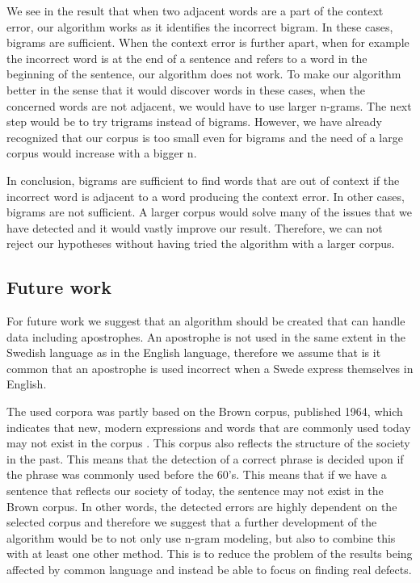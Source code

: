 \documentclass[a4paper,12pt]{article}
\begin{document}
We see in the result that when two adjacent words are a part of the context error, our algorithm works as it identifies the incorrect bigram. In these cases, bigrams are sufficient. When the context error is further apart, when for example the incorrect word is at the end of a sentence and refers to a word in the beginning of the sentence, our algorithm does not work. To make our algorithm better in the sense that it would discover words in these cases, when the concerned words are not adjacent, we would have to use larger n-grams. The next step would be to try trigrams instead of bigrams. However, we have already recognized that our corpus is too small even for bigrams and the need of a large corpus would increase with a bigger n.

In conclusion, bigrams are sufficient to find words that are out of context if the incorrect word is adjacent to a word producing the context error. In other cases, bigrams are not sufficient. A larger corpus would solve many of the issues that we have detected and it would vastly improve our result. Therefore, we can not reject our hypotheses without having tried the algorithm with a larger corpus.

\subsection{Future work}
\label{sec:futurework}
For future work we suggest that an algorithm should be created that can handle data including apostrophes. An apostrophe is not used in the same extent in the Swedish language as in the English language, therefore we assume that is it common that an apostrophe is used incorrect when a Swede express themselves in English. 
 
The used corpora was partly based on the Brown corpus, published 1964, which indicates that new, modern expressions and words that are commonly used today may not exist in the corpus \cite{francis64brown}. This corpus also reflects the structure of the society in the past. This means that the detection of a correct phrase is decided upon if the phrase was commonly used before the 60’s. This means that if we have a sentence that reflects our society of today, the sentence may not exist in the Brown corpus. In other words, the detected errors are highly dependent on the selected corpus and therefore we suggest that a further development of the algorithm would be to not only use n-gram modeling, but also to combine this with at least one other method. This is to reduce the problem of the results being affected by common language and instead be able to focus on finding real defects. 
\end{document}
